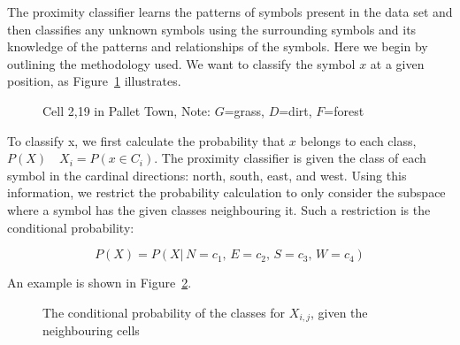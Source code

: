 
The proximity classifier learns the patterns of symbols present in the data set
and then classifies any unknown symbols using the surrounding symbols and its
knowledge of the patterns and relationships of the symbols. Here we begin by
outlining the methodology used.  We want to classify the symbol $x$ at a given
position, as Figure~\ref{fig:neighbours} illustrates.

\begin{figure}[h]
\begin{center}
\end{center}
\caption{Cell 2,19 in Pallet Town, Note: $G$=grass, $D$=dirt, $F$=forest}
\label{fig:neighbours}
\end{figure}

To classify x, we first calculate the probability that $x$ belongs to each
class, $P(X)\quad X_i = P(x\!\in\! C_i)$.  The proximity classifier is given
the class of each symbol in the cardinal directions: north, south, east, and
west. Using this information, we restrict the probability calculation to only
consider the subspace where a symbol has the given classes neighbouring it.
Such a restriction is the conditional probability:

\[
P(X) = P(X|\,N\!=\!c_1,\,E\!=\!c_2,\,S\!=\!c_3,\,W\!=\!c_4)
\]

An example is shown in Figure~\ref{fig:conditionalprob}.

\begin{figure}[h]
\begin{center}
\end{center}
\caption{The conditional probability of the classes for $X_{i,j}$, given the neighbouring cells}
\label{fig:conditionalprob}
\end{figure}



